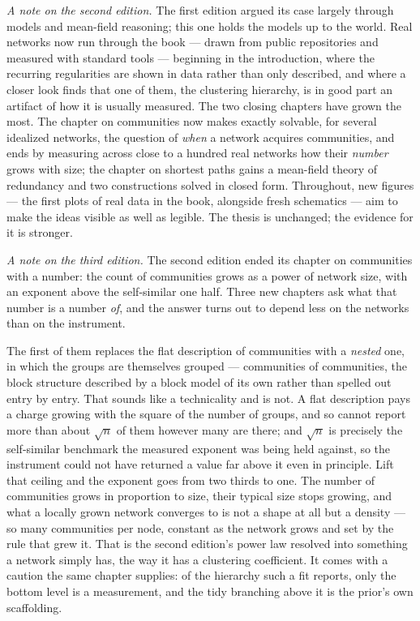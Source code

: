 \documentclass[10pt]{book}
\begin{document}
\emph{A note on the second edition.} The first edition argued its case largely
through models and mean-field reasoning; this one holds the models up to the
world. Real networks now run through the book --- drawn from public repositories
and measured with standard tools --- beginning in the introduction, where the
recurring regularities are shown in data rather than only described, and where a
closer look finds that one of them, the clustering hierarchy, is in good part an
artifact of how it is usually measured. The two closing chapters have grown the
most. The chapter on communities now makes exactly solvable, for several
idealized networks, the question of \emph{when} a network acquires communities,
and ends by measuring across close to a hundred real networks how their
\emph{number} grows with size; the chapter on shortest paths gains a mean-field
theory of redundancy and two constructions solved in closed form. Throughout, new
figures --- the first plots of real data in the book, alongside fresh schematics
--- aim to make the ideas visible as well as legible. The thesis is unchanged; the
evidence for it is stronger.

\emph{A note on the third edition.} The second edition ended its chapter on
communities with a number: the count of communities grows as a power of network
size, with an exponent above the self-similar one half. Three new chapters ask
what that number is a number \emph{of}, and the answer turns out to depend less
on the networks than on the instrument.

The first of them replaces the flat description of communities with a
\emph{nested} one, in which the groups are themselves grouped --- communities of
communities, the block structure described by a block model of its own rather
than spelled out entry by entry. That sounds like a technicality and is not. A
flat description pays a charge growing with the square of the number of groups,
and so cannot report more than about $\sqrt{n}$ of them however many are there;
and $\sqrt{n}$ is precisely the self-similar benchmark the measured exponent was
being held against, so the instrument could not have returned a value far above
it even in principle. Lift that ceiling and the exponent goes from two thirds to
one. The number of communities grows in proportion to size, their typical size
stops growing, and what a locally grown network converges to is not a shape at
all but a density --- so many communities per node, constant as the network grows
and set by the rule that grew it. That is the second edition's power law resolved
into something a network simply has, the way it has a clustering coefficient. It
comes with a caution the same chapter supplies: of the hierarchy such a fit
reports, only the bottom level is a measurement, and the tidy branching above it
is the prior's own scaffolding.
\end{document}
